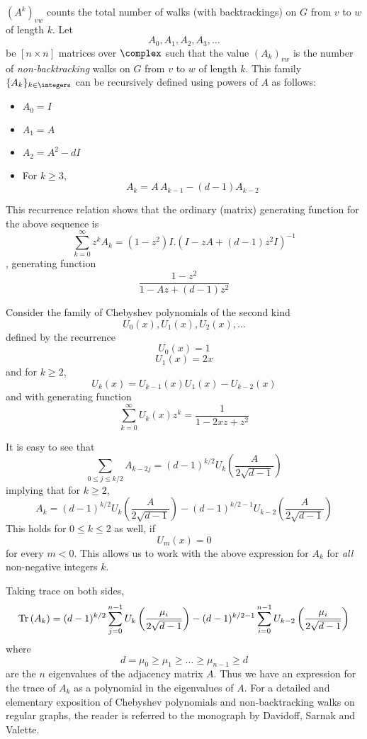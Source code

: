 \begin{description}
$(A^k)_{vw}$ counts the total number of walks (with backtrackings) on $G$
from $v$ to $w$ of length $k$. Let
$$A_0,A_1,A_2,A_3,\dots$$
be $[n \times n]$ matrices over $\complex$ such that the value $(A_k)_{vw}$
is the number of \emph{non-backtracking} walks on $G$ from $v$ to $w$ of length
$k$. This family $\{A_k\}_{k \in \integers}$ can be recursively defined
using powers of $A$ as follows:
\begin{itemize}
\item $A_0=I$
\item $A_1=A$
\item $A_2=A^2-dI$
\item For $k \geq 3$,
$$A_k=A\,A_{k-1}-(d-1)A_{k-2}$$
\end{itemize}
This recurrence relation shows that the
ordinary (matrix) generating function for the above sequence is
$$\sum \limits_{k=0}^{\infty} {z}^k A_k = (1- {z}^2)I.
  \left( I-{z}A + (d-1){z}^2 I \right)^{-1}$$
\ie, generating function
$$\frac{1-{z}^2}{1-A{z}+(d-1){z}^2}$$

Consider the
family of Chebyshev polynomials of the second kind
$$U_0(x), U_1(x), U_2(x), \dots $$
defined by the recurrence
$$U_0(x)=1$$
$$U_1(x) = 2x$$
and for $k \geq 2$,
$$U_k(x) = U_{k-1}(x)U_1(x) - U_{k-2}(x)$$
and with generating function
$$\sum \limits_{k=0}^{\infty} U_k(x){z}^k = \frac{1}{1-2x{z}+{z}^2}$$

It is easy to see that
$$\sum \limits_{0 \leq j \leq k/2} A_{k-2j} = (d-1)^{k/2} U_k \left( \frac{A}{2\sqrt{d-1}} \right)$$
implying that for $k \geq 2$,
$$A_k = (d-1)^{k/2} U_k \left( \frac{A}{2 \sqrt{d-1}} \right)
      - (d-1)^{k/2-1} U_{k-2} \left( \frac{A}{2 \sqrt{d-1}} \right)$$
This holds for $0 \leq k \leq 2$ as well, if
$$U_m(x) = 0$$
for every $m < 0$. This allows us to work with the above expression for
$A_k$ for \emph{all} non-negative integers $k$.

Taking trace on both
sides,
$$
\mbox{\rm Tr}\,(A_k) = (d-1)^{k/2} \sum \limits_{j=0}^{n-1}
             U_k \left( \frac{\mu_i}{2 \sqrt{d-1}} \right)
         -(d-1)^{k/2-1} \sum \limits_{i=0}^{n-1}
             U_{k-2} \left( \frac{\mu_i}{2 \sqrt{d-1}} \right) $$
where
$$d=\mu_0 \geq \mu_1 \geq \dots \geq \mu_{n-1} \geq d$$
are the $n$ eigenvalues of the adjacency matrix $A$. Thus we have an
expression for the trace of $A_k$ as a polynomial in the eigenvalues of
$A$.
For a detailed and elementary exposition of Chebyshev polynomials and
non-backtracking walks on regular graphs, the reader is referred to the
monograph by Davidoff, Sarnak and Valette.


\end{description}
